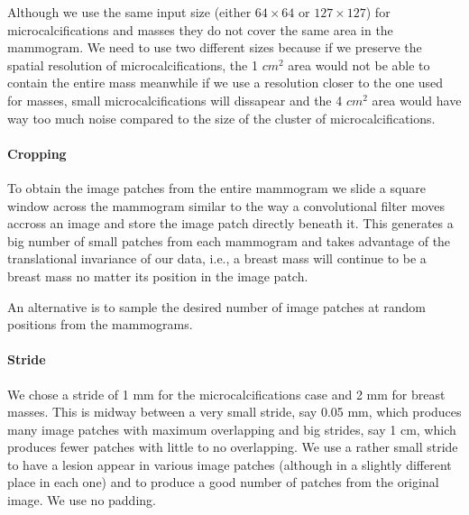 Although we use the same input size (either $64 \times 64$ or $127 \times 127$) for microcalcifications and masses they do not cover the same area in the mammogram. We need to use two different sizes because if we preserve the spatial resolution of microcalcifications, the 1 $cm^2$ area would not be able to contain the entire mass meanwhile if we use a resolution closer to the one used for masses, small microcalcifications will dissapear and the 4 $cm^2$ area would have way too much noise compared to the size of the cluster of microcalcifications.

\paragraph{Cropping}
To obtain the image patches from the entire mammogram we slide a square window across the mammogram similar to the way a convolutional filter moves accross an image and store the image patch directly beneath it. This generates a big number of small patches from each mammogram and takes advantage of the translational invariance of our data, i.e., a breast mass will continue to be a breast mass no matter its position in the image patch.

An alternative is to sample the desired number of image patches at random positions from the mammograms.

\paragraph{Stride}
We chose a stride of 1 mm for the microcalcifications case and 2 mm for breast masses. This is midway between a very small stride, say 0.05 mm, which produces many image patches with maximum overlapping and big strides, say 1 cm, which produces fewer patches with little to no overlapping. We use a rather small stride to have a lesion appear in various image patches (although in a slightly different place in each one) and to produce a good number of patches from the original image. We use no padding.

